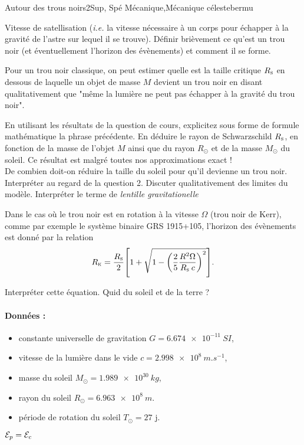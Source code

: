 
\begin{exercise}{Autour des trous noirs}{2}{Sup, Spé}
{Mécanique,Mécanique céleste}{bermu}

\begin{questions}
    \questioncours Vitesse de satellisation (\emph{i.e.} la vitesse nécessaire à un corps pour échapper à la gravité de l'astre sur lequel il se trouve).
    \question Définir brièvement ce qu'est un trou noir (et éventuellement l'horizon des évènements) et comment il se forme.
\begin{EnvUplevel}
Pour un trou noir classique, on peut estimer quelle est la taille critique $R_\textsc{s}$ en dessous de laquelle un objet de masse $M$ devient un trou noir en disant qualitativement que "même la lumière ne peut pas échapper à la gravité du trou noir".
\end{EnvUplevel}
    \question En utilisant les résultats de la question de cours, explicitez sous forme de formule mathématique la phrase précédente.
    \question En déduire le rayon de Schwarzschild $R_\textsc{s}$, en fonction de la masse de l'objet $M$ ainsi que du rayon $R_\odot$ et de la masse $M_\odot$ du soleil. Ce résultat est malgré toutes nos approximations exact !\\
    De combien doit-on réduire la taille du soleil pour qu'il devienne un trou noir. Interpréter au regard de la question 2.
\uplevel{\plusloin ~\vspace{-1em}}
    \question Discuter qualitativement des limites du modèle. Interpréter le terme de \emph{lentille gravitationelle}
\begin{EnvUplevel}
Dans le cas où le trou noir est en rotation à la vitesse $\Omega$ (trou noir de Kerr), comme par exemple le système binaire \textsf{GRS 1915+105}, l'horizon des évènements est donné par la relation
$$R_\textsc{k} = \dfrac{R_\textsc{s}}{2}\qty[1 + \sqrt{1 - \qty(\dfrac{2}{5}\dfrac{R^2 \Omega}{R_\textsc{s}\:c})^2}].$$
\end{EnvUplevel}
    \question Interpréter cette équation. Quid du soleil et de la terre ?
\end{questions}

\paragraph{Données :}
\begin{itemize}
    \item constante universelle de gravitation $G = \SI{6,674e-11}{SI}$,
    \item vitesse de la lumière dans le vide $c = \SI{2,998e8}{m.s^{-1}}$,
    \item masse du soleil $M_\odot = \SI{1,989e30}{kg}$,
    \item rayon du soleil $R_\odot = \SI{6,963e8}{m}$.
    \item période de rotation du soleil $T_\odot = 27$ j.
\end{itemize}
\end{exercise}

\begin{solution}  
    \begin{questions}
        \question $\mathcal{E}_p = \mathcal{E}_c$
    \end{questions}
\end{solution}